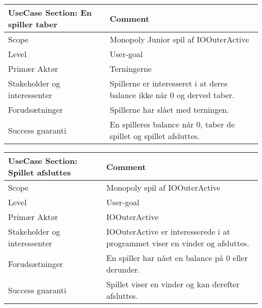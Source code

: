 \begin{center}
\begin{tabular}{ | m{10em} | m{10cm}| }
        \hline
            UseCase Section: En spiller taber & Comment\\
        \hline
            Scope & Monopoly Junior spil af IOOuterActive\\
        \hline
            Level & User-goal\\
        \hline
            Primær Aktør & Terningerne\\
        \hline
            Stakeholder og interessenter & Spillerne er interesseret i at deres balance ikke når 0 og derved taber.\\
        \hline
            Forudsætninger & Spillerne har slået med terningen.\\
        \hline
            Success guaranti & En spilleres balance når 0, taber de spillet og spillet afsluttes.\\
        \hline
    \end{tabular}
\end{center}

\begin{center}
\begin{tabular}{ | m{10em} | m{10cm}| }
        \hline
            UseCase Section: Spillet afsluttes & Comment\\
        \hline
            Scope & Monopoly spil af IOOuterActive\\
        \hline
            Level & User-goal\\
        \hline
            Primær Aktør & IOOuterActive\\
        \hline
            Stakeholder og interessenter & IOOuterActive er interesserede i at programmet viser en vinder og afsluttes.\\
        \hline
            Forudsætninger & En spiller har nået en balance på 0 eller derunder.\\
        \hline
            Success guaranti & Spillet viser en vinder og kan derefter afsluttes.\\
        \hline
    \end{tabular}
\end{center}